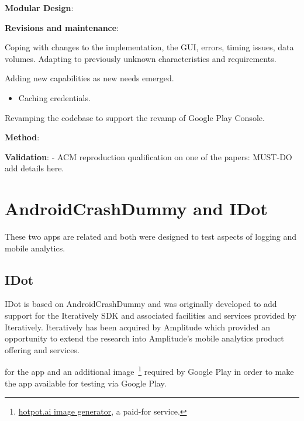 \textbf{Modular Design}:

\textbf{Revisions and maintenance}:

Coping with changes to the implementation, the GUI, errors, timing issues, data volumes. Adapting to previously unknown characteristics and requirements. 

Adding new capabilities as new needs emerged.
\begin{itemize}
    \item Caching credentials. 
\end{itemize}

Revamping the codebase to support the revamp of Google Play Console.

\textbf{Method}:


\textbf{Validation}:
- ACM reproduction qualification on one of the papers: MUST-DO add details here. 

\section{AndroidCrashDummy and IDot}
These two apps are related and both were designed to test aspects of logging and mobile analytics. 

\subsection{IDot}
IDot is based on AndroidCrashDummy and was originally developed to add support for the Iteratively SDK and associated facilities and services provided by Iteratively. Iteratively has been acquired by Amplitude which provided an opportunity to extend the research into Amplitude's mobile analytics product offering and services.

for the app and an additional image~\footnote{\href{https://hotpot.ai/download?id=f8bMnSY4NXWt_1024_500&email=julianharty@gmail.com}{hotpot.ai image generator}, a paid-for service.} required by Google Play in order to make the app available for testing via Google Play.

